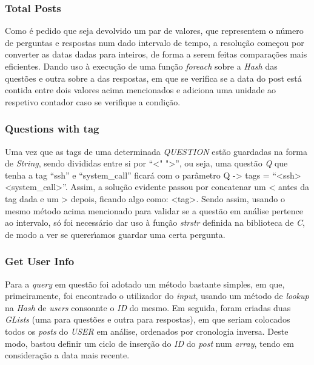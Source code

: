 \documentclass{article}
\begin{document}
\subsubsection{Total Posts}
\par Como \'{e} pedido que seja devolvido um par de valores, que representem o n\'{u}mero de perguntas e respostas num dado intervalo de tempo, a resolu\c{c}\~{a}o come\c{c}ou por converter as datas dadas para inteiros, de forma a serem feitas compara\c{c}\~{o}es mais eficientes. Dando uso \`{a} execu\c{c}\~{a}o de uma fun\c{c}\~{a}o \emph{foreach} sobre a \emph{Hash} das quest\~{o}es e outra sobre a das respostas, em que se verifica se a data do post est\'{a} contida entre dois valores acima mencionados e adiciona uma unidade ao respetivo contador caso se verifique a condi\c{c}\~{a}o.

\subsubsection{Questions with tag}
\par Uma vez que as tags de uma determinada \emph{QUESTION} est\~{a}o guardadas na forma de \emph{String}, sendo divididas entre si por \textquotedblleft{}\textless{}" "\textgreater{}\textquotedblright{}, ou seja, uma quest\~{a}o \emph{Q} que tenha a tag \textquotedblleft{}ssh\textquotedblright{} e \textquotedblleft{}system\_call\textquotedblright{} ficar\'{a} com o par\^{a}metro Q -\textgreater{} tags = \textquotedblleft{}\textless{}ssh\textgreater{}\textless{}system\_call\textgreater{}\textquotedblright{}. Assim, a solu\c{c}\~{a}o evidente passou por concatenar um \textless{} antes da tag dada e um \textgreater{} depois, ficando algo como: \textless{}tag\textgreater{}. Sendo assim, usando o mesmo m\'{e}todo acima mencionado para validar se a quest\~{a}o em an\'{a}lise pertence ao intervalo, s\'{o} foi necess\'{a}rio dar uso \`{a} fun\c{c}\~{a}o \emph{strstr} definida na biblioteca de \emph{C}, de modo a ver se querer\'{\i}amos guardar uma certa pergunta.  

\subsubsection{Get User Info}
\par Para a \emph{query} em quest\~{a}o foi adotado um m\'{e}todo bastante simples, em que, primeiramente, foi encontrado o utilizador do \emph{input}, usando um m\'{e}todo de \emph{lookup} na \emph{Hash} de \emph{users} consoante o \emph{ID} do mesmo. Em seguida, foram criadas duas \emph{GLists} (uma para quest\~{o}es e outra para respostas), em que seriam colocados todos os \emph{posts} do \emph{USER} em an\'{a}lise, ordenados por cronologia inversa. Deste modo, bastou definir um ciclo de inser\c{c}\~{a}o do \emph{ID} do \emph{post} num \emph{array}, tendo em considera\c{c}\~{a}o a data mais recente.
\end{document}
